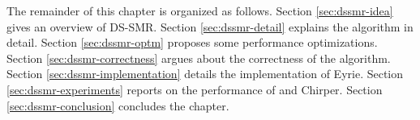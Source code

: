 The remainder of this chapter is organized as follows.
Section \ref{sec:dssmr-idea} gives an overview of DS-SMR.
Section \ref{sec:dssmr-detail} explains the algorithm in detail.
Section \ref{sec:dssmr-optm} proposes some performance optimizations.
Section \ref{sec:dssmr-correctness} argues about the correctness of the algorithm.
Section \ref{sec:dssmr-implementation} details the implementation of Eyrie.
Section \ref{sec:dssmr-experiments} reports on the performance of \dssmrlibname and Chirper.
Section \ref{sec:dssmr-conclusion} concludes the chapter.
